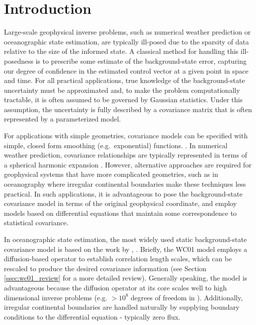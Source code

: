\section{Introduction}
\label{sec:intro}

Large-scale geophysical inverse problems,
such as numerical weather prediction or
oceanographic state estimation, are typically ill-posed due to the
sparsity of data relative to the size of the informed state.
A classical method for handling this ill-posedness is to prescribe
some estimate of the background-state error, capturing our degree of confidence in the
estimated control vector at a given point in space and time.
For all practical applications, true knowledge of the background-state
uncertainty must be approximated and, to make the problem computationally
tractable, it is often assumed to be governed by Gaussian statistics.
Under this assumption, the uncertainty is fully described by a covariance
matrix that is often represented by a parameterized model.

For applications with simple geometries, covariance models can be specified with
simple, closed form smoothing (e.g.\ exponential) functions.
.
In numerical weather prediction,
covariance relationships are typically represented in terms of a spherical
harmonic expansion .
However, alternative approaches are required for geophysical systems that have
more complicated geometries, such as in oceanography
where irregular continental boundaries make these techniques less practical.
In such applications, it is advantageous to pose the background-state covariance
model in terms of the original geophysical coordinate, and employ models based on differential
equations that maintain some correspondence to statistical covariance.

In oceanographic state estimation, the most widely used static background-state
covariance model is based on the work by
\citet[][WC01 hereafter]{weaver_correlation_2001},
\citep[e.g.][]{nguyen_arctic_2021,forgetECCOv4,moore_regional_2011-1,mazloff_eddy-permitting_2010,gebbie_strategies_2006}.
Briefly, the WC01 model employs a diffusion-based operator to establish
correlation length scales, which can be rescaled to produce the desired covariance
information (see Section \ref{ssec:wc01_review} for a more detailed review).
Generally speaking, the model is advantageous because
the diffusion operator at its core scales well to high dimensional inverse problems
(e.g. $>10^8$ degrees of freedom in \citet{forgetECCOv4}).
Additionally, irregular continental boundaries are handled naturally by
supplying boundary conditions to the differential equation - typically zero
flux.

